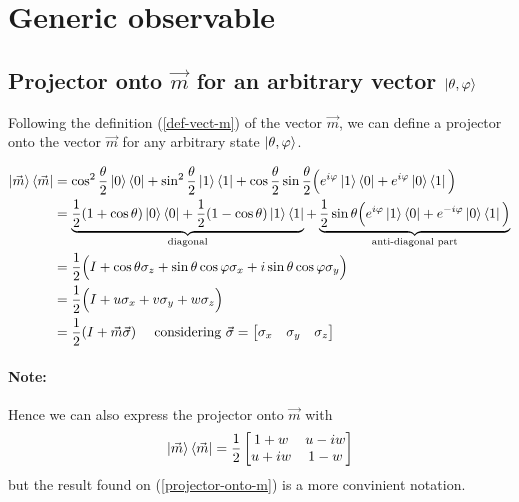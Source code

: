 \documentclass{article}
\begin{document}
\section{Generic observable}
\subsection{Projector onto \texorpdfstring{$\vec{m}$}{Lg} for an arbitrary
vector \texorpdfstring{$\ket{\theta, \varphi}$}{Lg}}

Following the definition (\ref{def-vect-m}) of the vector $\vec{m}$, we can
define a projector onto the vector $\vec{m}$ for any arbitrary state
$\ket{\theta, \varphi}$.

\begin{equation}
    \begin{aligned}
        \label{projector-onto-m}
        \ket{\vec{m}}\bra{\vec{m}}
            & = \cos^2\frac{\theta}{2}\ket{0}\bra{0}+\sin^2\frac{\theta}{2}\ket{1}\bra{1} +
                \cos\frac{\theta}{2}\sin\frac{\theta}{2}\Big(e^{i\varphi}\ket{1}\bra{0}+e^{i\varphi}
                \ket{0}\bra{1}\Big) \\
            & = \underbrace{\frac{1}{2}(1+\cos\theta)\ket{0}\bra{0}+
                \frac{1}{2}(1-\cos\theta)\ket{1}\bra{1}}_{\text{diagonal}} +
                \underbrace{\frac{1}{2}\sin\theta
                \Big(e^{i\varphi}\ket{1}\bra{0}+e^{-i\varphi}\ket{0}\bra{1}\Big)}_{
                \text{anti-diagonal part}} \\
            & = \frac{1}{2}\Big(I + \cos\theta\sigma_z + \sin\theta\cos\varphi\sigma_x +
            i\sin\theta\cos\varphi\sigma_y \Big) \\
            & = \frac{1}{2}\Big(I + u\sigma_x + v\sigma_y + w\sigma_z \Big) \\
            & = \frac{1}{2}(I+\vec{m}\vec{\sigma})
                \quad \text{ considering } \vec{\sigma}=\begin{bmatrix}\sigma_x & \sigma_y &
                \sigma_z\end{bmatrix}
    \end{aligned}
\end{equation}

\paragraph{Note: } Hence we can also express the projector onto $\vec{m}$ with
\begin{equation}
    \ket{\vec{m}}\bra{\vec{m}}= \frac{1}{2}\begin{bmatrix}
        1+w & u-iw \\ u+iw & 1-w
    \end{bmatrix}
\end{equation}
but the result found on (\ref{projector-onto-m}) is a more convinient notation.
\end{document}
